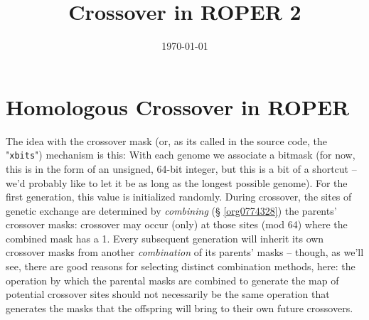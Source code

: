\documentclass[11pt]{article}
\date{\today}
\title{Crossover in ROPER 2}
\begin{document}
\maketitle
\tableofcontents


\section{Homologous Crossover in ROPER}
\label{sec:org4717fa2}
The idea with the crossover mask (or, as its called in the source code, the
"\texttt{xbits}") mechanism is this: With each genome we associate a bitmask (for now,
this is in the form of an unsigned, 64-bit integer, but this is a bit of a
shortcut -- we'd probably like to let it be as long as the longest possible
genome). For the first generation, this value is initialized randomly. During
crossover, the sites of genetic exchange are determined by \emph{combining} (\S
\ref{org0774328}) the parents' crossover masks: crossover may occur (only) at
those sites (mod 64) where the combined mask has a 1. Every subsequent generation
will inherit its own crossover masks from another \emph{combination} of its parents'
masks -- though, as we'll see, there are good reasons for selecting distinct
combination methods, here: the operation by which the parental masks are combined
to generate the map of potential crossover sites should not necessarily be the
same operation that generates the masks that the offspring will bring to their
own future crossovers.
\end{document}
